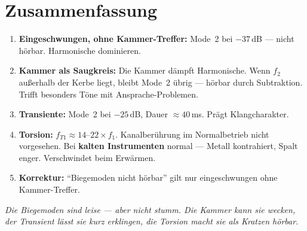 \documentclass[11pt,a4paper]{article}
\begin{document}
\section{Zusammenfassung}

\begin{enumerate}
\item \textbf{Eingeschwungen, ohne Kammer-Treffer:} Mode~2 bei $-37$\,dB ---
  nicht hörbar. Harmonische dominieren.
\item \textbf{Kammer als Saugkreis:} Die Kammer dämpft Harmonische.
  Wenn $f_2$ außerhalb der Kerbe liegt, bleibt Mode~2 übrig --- hörbar
  durch Subtraktion. Trifft besonders Töne mit Ansprache-Problemen.
\item \textbf{Transiente:} Mode~2 bei $-25$\,dB, Dauer $\approx 40$\,ms.
  Prägt Klangcharakter.
\item \textbf{Torsion:} $f_{T1} \approx 14$--$22 \times f_1$.
  Kanalberührung im Normalbetrieb nicht vorgesehen.
  Bei \textbf{kalten Instrumenten} normal --- Metall kontrahiert, Spalt enger.
  Verschwindet beim Erwärmen.
\item \textbf{Korrektur:} ``Biegemoden nicht hörbar'' gilt nur eingeschwungen
  ohne Kammer-Treffer.
\end{enumerate}

\bigskip
\textit{Die Biegemoden sind leise --- aber nicht stumm.
Die Kammer kann sie wecken, der Transient lässt sie kurz erklingen,
die Torsion macht sie als Kratzen hörbar.}
\end{document}
